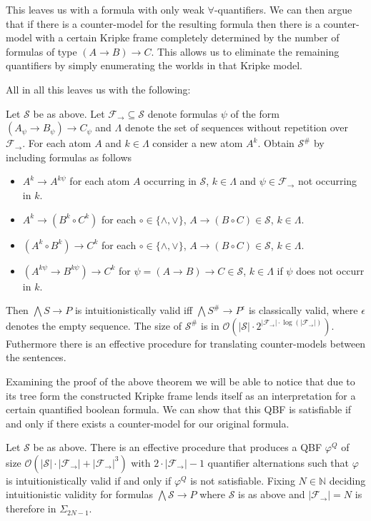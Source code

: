 \documentclass[a4paper,UKenglish,cleveref, autoref, thm-restate]{lipics-v2021}
\begin{document}
This leaves us with a formula with only weak $\forall$-quantifiers. We can then argue that if there is a counter-model for the resulting formula then there is a counter-model with a certain Kripke frame completely determined by the number of formulas of type $(A\to B)\to C$. This allows us to eliminate the remaining quantifiers by simply enumerating the worlds in that Kripke model.

All in all this leaves us with the following:

\begin{theorem}
	Let $\mathcal S$ be as above. Let $\mathcal F_\to\subseteq\mathcal S$ denote formulas $\psi$ of the form $(A_\psi\to B_\psi)\to C_\psi$ and $\Lambda$ denote the set of sequences without repetition over $\mathcal F_\to$. For each atom $A$ and $k\in\Lambda$ consider a new atom $A^k$. Obtain $\mathcal S^\#$ by including formulas as follows
	\begin{itemize}
		\item $A^k\to A^{k\psi}$ for each atom $A$ occurring in $\mathcal S$, $k\in\Lambda$ and $\psi\in\mathcal F_\to$ not occurring in $k$.
		\item $A^k\to (B^k\circ C^k)$ for each $\circ\in\{\wedge,\vee\}$, $A\to (B\circ C)\in\mathcal S$, $k\in\Lambda$.
		\item $(A^k\circ B^k)\to C^k$ for each $\circ\in\{\wedge,\vee\}$, $A\to (B\circ C)\in\mathcal S$, $k\in\Lambda$.
		\item $(A^{k\psi}\to B^{k\psi})\to C^k$ for $\psi = (A\to B)\to C\in\mathcal S$, $k\in\Lambda$ if $\psi$ does not occurr in $k$.
	\end{itemize}
	Then $\bigwedge S\to P$ is intuitionistically valid iff $\bigwedge S^\#\to P^\epsilon$ is classically valid, where $\epsilon$ denotes the empty sequence. The size of $\mathcal S^\#$ is in $\mathcal O(|\mathcal S|\cdot2^{|\mathcal F_\to|\cdot\log(|\mathcal F_\to|)})$. Futhermore there is an effective procedure for translating counter-models between the sentences.
\end{theorem}

Examining the proof of the above theorem we will be able to notice that due to its tree form the constructed Kripke frame lends itself as an interpretation for a certain quantified boolean formula. We can show that this QBF is satisfiable if and only if there exists a counter-model for our original formula.

\begin{theorem}
	Let $\mathcal S$ be as above. There is an effective procedure that produces a QBF $\varphi^Q$ of size $\mathcal O(|\mathcal S|\cdot|\mathcal F_\to| + |\mathcal F_\to|^3)$ with $2\cdot |\mathcal F_\to|-1$ quantifier alternations such that $\varphi$ is intuitionistically valid if and only if $\varphi^Q$ is not satisfiable. Fixing $N\in\mathbb N$ deciding intuitionistic validity for formulas $\bigwedge \mathcal S\to P$ where $\mathcal S$ is as above and $|\mathcal F_\to| = N$ is therefore in $\Sigma_{2N-1}$.
\end{theorem}
\end{document}
